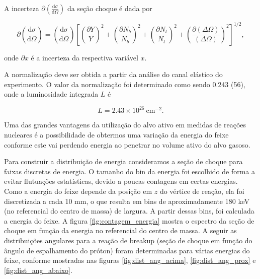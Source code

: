 \documentclass[a4paper,12pt,oneside]{book}
\begin{document}

\par A incerteza $\partial \left(\frac{\mathrm{d}\sigma}{\mathrm{d}\Omega}\right)$ da seção choque é dada por

\begin{equation}
	\partial\left(\frac{\mathrm{d} \sigma}{\mathrm{d} \Omega}\right)=\left(\frac{\mathrm{d} \sigma}{\mathrm{d} \Omega}\right)\left[\left(\frac{\partial Y}{Y}\right)^{2}+\left(\frac{\partial N_{b}}{N_{b}}\right)^{2}+\left(\frac{\partial N_{t}}{N_{t}}\right)^{2}+\left(\frac{\partial(\Delta \Omega)}{(\Delta \Omega)}\right)^{2}\right]^{1 / 2},
\end{equation}

\par onde $\partial x$ é a incerteza da respectiva variável $x$.

\par A normalização deve ser obtida a partir da análise do canal elástico do experimento. O valor da normalização foi determinado como sendo 0.243 (56), onde a luminosidade integrada $L$ é

\begin{equation}
	L = 2.43\times 10^{26} \: \mathrm{cm}^{-2}.
\end{equation}

\par Uma das grandes vantagens da utilização do alvo ativo em medidas de reações nucleares é a possibilidade de obtermos uma variação da energia do feixe conforme este vai perdendo energia ao penetrar no volume ativo do alvo gasoso.
\par Para construir a distribuição de energia consideramos a seção de choque para faixas discretas de energia. O tamanho do bin da energia foi escolhido de forma a evitar flutuações estatísticas, devido a poucas contagens em certas energias. Como a energia do feixe depende da posição em $z$ do vértice de reação, ela foi discretizada a cada 10 mm, o que resulta em bins de aproximadamente 180 keV (no referencial do centro de massa) de largura. A partir dessas bins, foi calculada a energia do feixe. A figura \ref{fig:contagem_energia} mostra o espectro da seção de choque em função da energia no referencial do centro de massa. A seguir as distribuições angulares para a reação de breakup (seção de choque em função do ângulo de espalhamento do próton) foram determinadas para várias energias do feixe, conforme mostradas nas figuras  \ref{fig:dist_ang_acima}, \ref{fig:dist_ang_prox} e \ref{fig:dist_ang_abaixo}.
\end{document}
